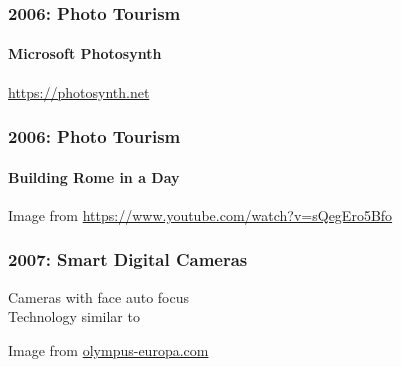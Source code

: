 \documentclass[xetex,professionalfont]{beamer}
\begin{document}

\begin{frame}
\frametitle{2006: Photo Tourism}
\framesubtitle{Microsoft Photosynth}

\begin{center}
\url{https://photosynth.net}
\end{center}

\end{frame}


\begin{frame}
\frametitle{2006: Photo Tourism}
\framesubtitle{Building Rome in a Day}

\begin{center}
	{\centering Image from \url{https://www.youtube.com/watch?v=sQegEro5Bfo}}
\end{center}

\end{frame}


\begin{frame}
\frametitle{2007: Smart Digital Cameras}

Cameras with face auto focus\\\medskip
Technology similar to \cite{viola2001}

\bigskip
\begin{center}
	{\centering Image from \url{olympus-europa.com}}
\end{center}

\end{frame}
\end{document}
